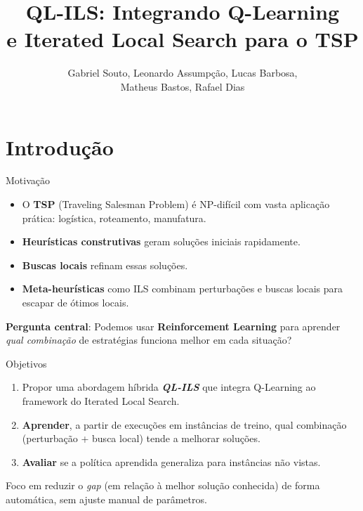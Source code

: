 \documentclass[11pt, xcolor=dvipsnames]{beamer}
\title[\sutil{QL-ILS}]{QL-ILS: Integrando Q-Learning \\ e Iterated Local Search para o TSP}
\author[\sutil{Grupo RL-CO}]{\intsize Gabriel Souto, Leonardo Assumpção, Lucas Barbosa, \\ Matheus Bastos, Rafael Dias}
\institute[UFRJ]{\intsize PESC/COPPE/UFRJ -- OTIMIA (COS887)}
\date[]{\sutil{09/12/2025}}
\newcommand{\destaque}[1]{\textbf{\textcolor{verde}{#1}}}
\begin{document}
\maketitle

\section{Introdução}

\begin{frame}{Motivação}
  \footnotesize
  \begin{itemize}
    \item O \destaque{TSP} (Traveling Salesman Problem) é NP-difícil com vasta aplicação prática: logística, roteamento, manufatura.
    \item \destaque{Heurísticas construtivas} geram soluções iniciais rapidamente.
    \item \destaque{Buscas locais} refinam essas soluções.
    \item \destaque{Meta-heurísticas} como ILS combinam perturbações e buscas locais para escapar de ótimos locais.
  \end{itemize}
  \vspace{3mm}
  \begin{calloutbox}
    {\footnotesize
    \textbf{Pergunta central}: Podemos usar \destaque{Reinforcement Learning} para aprender \emph{qual combinação} de estratégias funciona melhor em cada situação?
    }
  \end{calloutbox}
\end{frame}

\begin{frame}{Objetivos}
  \footnotesize
  \begin{enumerate}
    \item Propor uma abordagem híbrida \destaque{\emph{QL-ILS}} que integra Q-Learning ao framework do Iterated Local Search.
    \item \destaque{Aprender}, a partir de execuções em instâncias de treino, qual combinação (perturbação + busca local) tende a melhorar soluções.
    \item \destaque{Avaliar} se a política aprendida generaliza para instâncias não vistas.
  \end{enumerate}
  \vspace{4mm}
  \begin{calloutbox}
    {\scriptsize
    Foco em reduzir o \emph{gap} (em relação à melhor solução conhecida) de forma automática, sem ajuste manual de parâmetros.
    }
  \end{calloutbox}
\end{frame}
\end{document}
